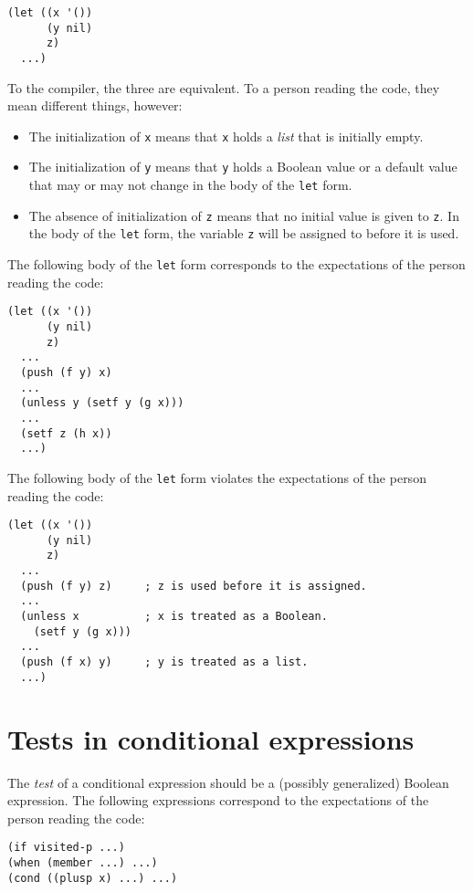 \begin{verbatim}
(let ((x '())
      (y nil)
      z)
  ...)
\end{verbatim}

To the compiler, the three are equivalent.  To a person reading the
code, they mean different things, however:

\begin{itemize}
\item The initialization of \texttt{x} means that \texttt{x} holds a
  \emph{list} that is initially empty.
\item The initialization of \texttt{y} means that \texttt{y} holds a
  Boolean value or a default value that may or may not change in the
  body of the \texttt{let} form.
\item The absence of initialization of \texttt{z} means that no
  initial value is given to \texttt{z}.  In the body of the
  \texttt{let} form, the variable \texttt{z} will be assigned to
  before it is used.
\end{itemize}

The following body of the \texttt{let} form corresponds to the
expectations of the person reading the code:

\begin{verbatim}
(let ((x '())
      (y nil)
      z)
  ...
  (push (f y) x)
  ...
  (unless y (setf y (g x)))
  ...
  (setf z (h x))
  ...)
\end{verbatim}

The following body of the \texttt{let} form violates the expectations
of the person reading the code:

\begin{verbatim}
(let ((x '())
      (y nil)
      z)
  ...
  (push (f y) z)     ; z is used before it is assigned.
  ...
  (unless x          ; x is treated as a Boolean.
    (setf y (g x)))
  ...
  (push (f x) y)     ; y is treated as a list.
  ...)
\end{verbatim}

\section{Tests in conditional expressions}

The \emph{test} of a conditional expression should be a (possibly
generalized) Boolean expression.  The following expressions correspond
to the expectations of the person reading the code:

\begin{verbatim}
(if visited-p ...)
(when (member ...) ...)
(cond ((plusp x) ...) ...)
\end{verbatim}

